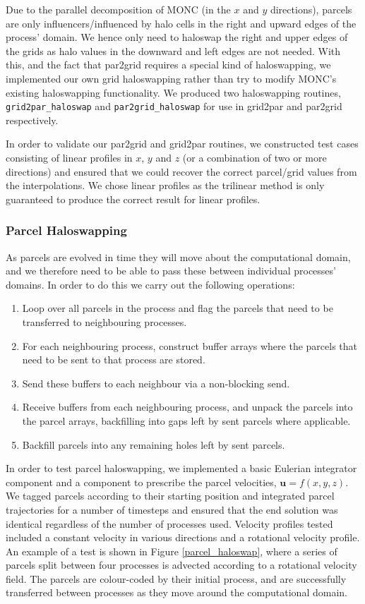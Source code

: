 \documentclass{article}
\renewcommand{\v}[1]{\ensuremath{\mathbf{#1}}} %
\begin{document}
Due to the parallel decomposition of MONC (in the $x$ and $y$ directions), parcels are only influencers/influenced by halo cells in the right and upward edges of the process' domain. We hence only need to haloswap the right and upper edges of the grids as halo values in the downward and left edges are not needed. With this, and the fact that par2grid requires a special kind of haloswapping, we implemented our own grid haloswapping rather than try to modify MONC's existing haloswapping functionality. We produced two haloswapping routines, \verb|grid2par_haloswap| and \verb|par2grid_haloswap| for use in grid2par and par2grid respectively.

In order to validate our par2grid and grid2par routines, we constructed test cases consisting of linear profiles in $x$, $y$ and $z$ (or a combination of two or more directions) and ensured that we could recover the correct parcel/grid values from the interpolations. We chose linear profiles as the trilinear method is only guaranteed to produce the correct result for linear profiles.

\subsubsection{Parcel Haloswapping}\label{parcel_haloswapping}
As parcels are evolved in time they will move about the computational domain, and we therefore need to be able to pass these between individual processes' domains. In order to do this we carry out the following operations:
\begin{enumerate}
  \item Loop over all parcels in the process and flag the parcels that need to be transferred to neighbouring processes.
  \item For each neighbouring process, construct buffer arrays where the parcels that need to be sent to that process are stored.
  \item Send these buffers to each neighbour via a non-blocking send.
  \item Receive buffers from each neighbouring process, and unpack the parcels into the parcel arrays, backfilling into gaps left by sent parcels where applicable.
  \item Backfill parcels into any remaining holes left by sent parcels.
\end{enumerate}

In order to test parcel haloswapping, we implemented a basic Eulerian integrator component and a component to prescribe the parcel velocities, $\v{u} = f(x,y,z)$. We tagged parcels according to their starting position and integrated parcel trajectories for a number of timesteps and ensured that the end solution was identical regardless of the number of processes used. Velocity profiles tested included a constant velocity in various directions and a rotational velocity profile. An example of a test is shown in Figure \ref{parcel_haloswap}, where a series of parcels split between four processes is advected according to a rotational velocity field. The parcels are colour-coded by their initial process, and are successfully transferred between processes as they move around the computational domain.
\end{document}
